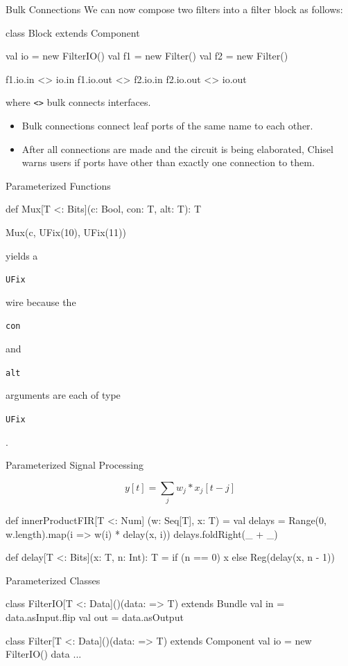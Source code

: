 \documentclass[xcolor=pdflatex,dvipsnames,table]{beamer}
\newcommand{\code}[1]{\begin{footnotesize}{\tt #1}\end{footnotesize}}
\begin{document}
\begin{frame}[fragile]{Bulk Connections}
We can now compose two filters into a filter block as follows:

\begin{scala}
class Block extends Component { 
  val io = new FilterIO()
  val f1 = new Filter()
  val f2 = new Filter()

  f1.io.in  <> io.in
  f1.io.out <> f2.io.in
  f2.io.out <> io.out
}
\end{scala}

\noindent
where \verb+<>+ bulk connects interfaces.
\begin{itemize}
\item Bulk connections connect leaf ports of the same name to each other.
\item After all connections are made and the circuit is being elaborated,
Chisel warns users if ports have other than exactly one connection to them.
\end{itemize}

\end{frame}

\begin{frame}[fragile]{Parameterized Functions}
\begin{scala}
def Mux[T <: Bits](c: Bool, con: T, alt: T): T

Mux(c, UFix(10), UFix(11))
\end{scala}

\noindent
yields a \code{UFix} wire because the \code{con} and \code{alt}
arguments are each of type \code{UFix}.
\end{frame}

\begin{frame}[fragile]{Parameterized Signal Processing}

\begin{equation}
y[t] = \sum_j w_j * x_j[t-j]
\end{equation}

\begin{scala}
def innerProductFIR[T <: Num] (w: Seq[T], x: T) = {
  val delays = Range(0, w.length).map(i => w(i) * delay(x, i))
  delays.foldRight(_ + _)
}

def delay[T <: Bits](x: T, n: Int): T =
  if (n == 0) x else Reg(delay(x, n - 1))
\end{scala}

\end{frame}

\begin{frame}[fragile]{Parameterized Classes}
\begin{scala}
class FilterIO[T <: Data]()(data: => T) extends Bundle { 
  val in  = data.asInput.flip
  val out = data.asOutput
}

class Filter[T <: Data]()(data: => T) extends Component { 
  val io = new FilterIO(){ data }
  ...
}
\end{scala}
\end{frame}
\end{document}
